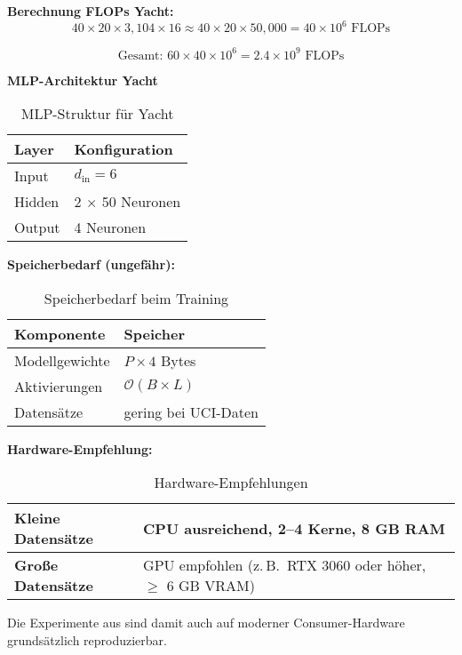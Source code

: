 \vspace{-0.5em}

\textbf{Berechnung FLOPs Yacht:}
\[
40 \times 20 \times 3{,}104 \times 16 
\approx 40 \times 20 \times 50,000 
= 40 \times 10^6 \text{ FLOPs}
\]

\[
\text{Gesamt: } 
60 \times 40 \times 10^6 
= 2.4 \times 10^9 \text{ FLOPs}
\]

\vspace{0.5em}

\noindent
\textbf{MLP-Architektur Yacht}

\vspace{0.3em}

\begin{table}[!htbp]
  \centering
  \begin{tabular}{ll}
    \toprule
    \textbf{Layer} & \textbf{Konfiguration} \\
    \midrule
    Input & $d_\text{in} = 6$ \\
    Hidden & 2 × 50 Neuronen \\
    Output & 4 Neuronen \\
    \bottomrule
  \end{tabular}
  \caption{MLP-Struktur für Yacht}
\end{table}

\vspace{1em}

\noindent
\textbf{Speicherbedarf (ungefähr):}

\vspace{0.5em}

\begin{table}[!htbp]
  \centering
  \begin{tabular}{ll}
    \toprule
    \textbf{Komponente} & \textbf{Speicher} \\
    \midrule
    Modellgewichte & $P \times 4$ Bytes \\
    Aktivierungen & $\mathcal{O}(B \times L)$ \\
    Datensätze & gering bei UCI-Daten \\
    \bottomrule
  \end{tabular}
  \caption{Speicherbedarf beim Training}
\end{table}

\vspace{1em}

\noindent
\textbf{Hardware-Empfehlung:}

\vspace{0.5em}

\begin{table}[!htbp]
  \centering
  \begin{tabular}{p{}p{}}
    \toprule
    \textbf{Kleine Datensätze} & CPU ausreichend, 2–4 Kerne, 8 GB RAM \\
    \midrule
    \textbf{Große Datensätze} & GPU empfohlen (z.\,B.\ RTX 3060 oder höher, $\geq$ 6 GB VRAM) \\
    \bottomrule
  \end{tabular}
  \caption{Hardware-Empfehlungen}
\end{table}

\vspace{0.5em}

\noindent
Die Experimente aus \parencite{amini2020deep} sind damit auch auf moderner Consumer-Hardware grundsätzlich reproduzierbar.
